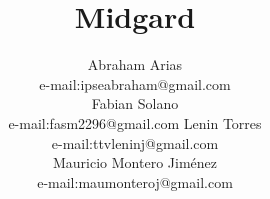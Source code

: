 \documentclass[twocolumn]{IEEEtran}
\begin{document}
\title{Midgard}







 


\author{Abraham Arias\\
        e-mail:ipseabraham@gmail.com\\
        Fabian Solano\\
        e-mail:fasm2296@gmail.com
        Lenin Torres\\
        e-mail:ttvleninj@gmail.com\\
        Mauricio Montero Jiménez\\
        e-mail:maumonteroj@gmail.com\\
}
\end{document}
